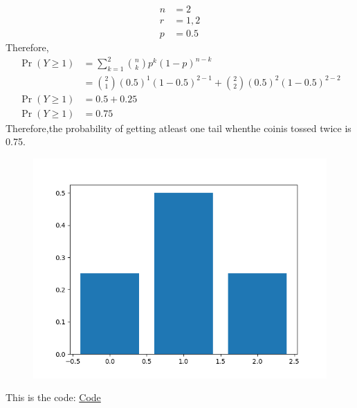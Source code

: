 \documentclass[12pt,twocolumn]{article}
\begin{document}
\begin{align}
	n &= 2\\
	r &= 1,2\\
	p &= 0.5
\end{align}
Therefore,
\begin{align}
	\Pr(Y\geq 1)&=\sum_{k=1}^2 \binom nk p^k(1-p)^{n-k}\\
	&=\binom 21(0.5)^1(1-0.5)^{2-1}+\binom 22 (0.5)^2(1-0.5)^{2-2}\\
	\Pr(Y\geq 1)&=0.5+0.25\\
	\Pr(Y\geq 1)&= 0.75
\end{align}
Therefore,the probability of getting atleast one tail whenthe coinis tossed twice is 0.75.\\
\begin{table}[h]
	
\end{table}
\begin{figure}[h]
    \centering
\includegraphics[width=\columnwidth]{fig/11.16.3.2.png}
\end{figure}
This is the code: \href{https://github.com/ShreyaniReddy/IITH-FWC/blob/main/probability/11.16.3.2/codes/11.16.3.2.py}{Code}
\end{document}
